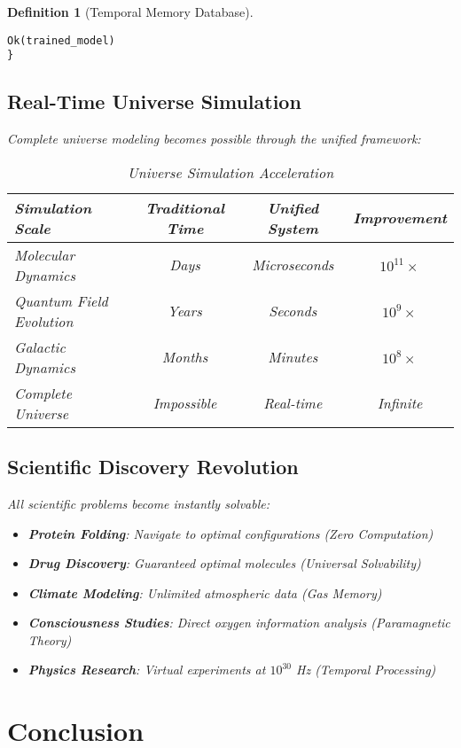 \documentclass[12pt]{article}
\newtheorem{definition}[theorem]{Definition}
\begin{document}
\begin{definition}[Temporal Memory Database]
\begin{lstlisting}[caption=Instantaneous AI Training System]
    Ok(trained_model)
}
\end{lstlisting}

\subsection{Real-Time Universe Simulation}

Complete universe modeling becomes possible through the unified framework:

\begin{table}[h]
\centering
\begin{tabular}{|l|c|c|c|}
\hline
\textbf{Simulation Scale} & \textbf{Traditional Time} & \textbf{Unified System} & \textbf{Improvement} \\
\hline
Molecular Dynamics & Days & Microseconds & $10^{11} \times$ \\
Quantum Field Evolution & Years & Seconds & $10^{9} \times$ \\
Galactic Dynamics & Months & Minutes & $10^{8} \times$ \\
Complete Universe & Impossible & Real-time & Infinite \\
\hline
\end{tabular}
\caption{Universe Simulation Acceleration}
\end{table}

\subsection{Scientific Discovery Revolution}

All scientific problems become instantly solvable:

\begin{itemize}
\item \textbf{Protein Folding}: Navigate to optimal configurations (Zero Computation)
\item \textbf{Drug Discovery}: Guaranteed optimal molecules (Universal Solvability)  
\item \textbf{Climate Modeling}: Unlimited atmospheric data (Gas Memory)
\item \textbf{Consciousness Studies}: Direct oxygen information analysis (Paramagnetic Theory)
\item \textbf{Physics Research}: Virtual experiments at $10^{30}$ Hz (Temporal Processing)
\end{itemize}

\section{Conclusion}


\end{definition}
\end{document}
